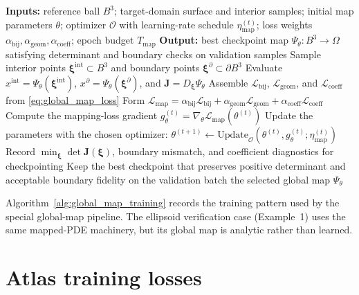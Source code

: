 \documentclass[sort&compress]{svjour3} %
\newcommand\StateX{\Statex\hspace{\algorithmicindent}}
\begin{document}
\begin{algorithm}[htbp]
\caption{Special-case training of a learned global volumetric map}
\label{alg:global_map_training}
\small
\begin{algorithmic}[1]
\Statex \textbf{Inputs:} reference ball $B^3$; target-domain surface and interior samples; initial map parameters $\theta$;
\StateX optimizer $\mathcal{O}$ with learning-rate schedule $\eta_{\mathrm{map}}^{(t)}$; loss weights $\alpha_{\mathrm{bij}},\alpha_{\mathrm{geom}},\alpha_{\mathrm{coeff}}$; epoch budget $T_{\mathrm{map}}$
\Statex \textbf{Output:} best checkpoint map $\Psi_\theta:B^3\rightarrow\Omega$ satisfying determinant and boundary checks on validation samples
    \State Sample interior points $\boldsymbol{\xi}^{\mathrm{int}}\subset B^3$ and boundary points $\boldsymbol{\xi}^{\partial}\subset \partial B^3$
    \State Evaluate $x^{\mathrm{int}}=\Psi_\theta(\boldsymbol{\xi}^{\mathrm{int}})$, $x^{\partial}=\Psi_\theta(\boldsymbol{\xi}^{\partial})$, and $\mathbf{J}=D_{\boldsymbol{\xi}}\Psi_\theta$
    \State Assemble $\mathcal{L}_{\mathrm{bij}}$, $\mathcal{L}_{\mathrm{geom}}$, and $\mathcal{L}_{\mathrm{coeff}}$ from \eqref{eq:global_map_loss}
    \State Form $\mathcal{L}_{\mathrm{map}}=\alpha_{\mathrm{bij}}\mathcal{L}_{\mathrm{bij}}+\alpha_{\mathrm{geom}}\mathcal{L}_{\mathrm{geom}}+\alpha_{\mathrm{coeff}}\mathcal{L}_{\mathrm{coeff}}$
    \State Compute the mapping-loss gradient $g_{\theta}^{(t)}=\nabla_{\theta}\mathcal{L}_{\mathrm{map}}(\theta^{(t)})$
    \State Update the parameters with the chosen optimizer:
    \Statex \hspace{\algorithmicindent}$\theta^{(t+1)} \leftarrow \mathrm{Update}_{\mathcal{O}}\!\left(\theta^{(t)},g_{\theta}^{(t)};\eta_{\mathrm{map}}^{(t)}\right)$
    \State Record $\min_{\boldsymbol{\xi}}\det \mathbf{J}(\boldsymbol{\xi})$, boundary mismatch, and coefficient diagnostics for checkpointing
    \State Keep the best checkpoint that preserves positive determinant and acceptable boundary fidelity on the validation batch
\EndFor
\State \Return the selected global map $\Psi_\theta$
\end{algorithmic}
\end{algorithm}

Algorithm~\ref{alg:global_map_training} records the training pattern used by the special global-map pipeline. The ellipsoid verification case (Example~1) uses the same mapped-PDE machinery, but its global map is analytic rather than learned.

\section{Atlas training losses}
\label{sec:appendix_pipeline}
\end{document}
